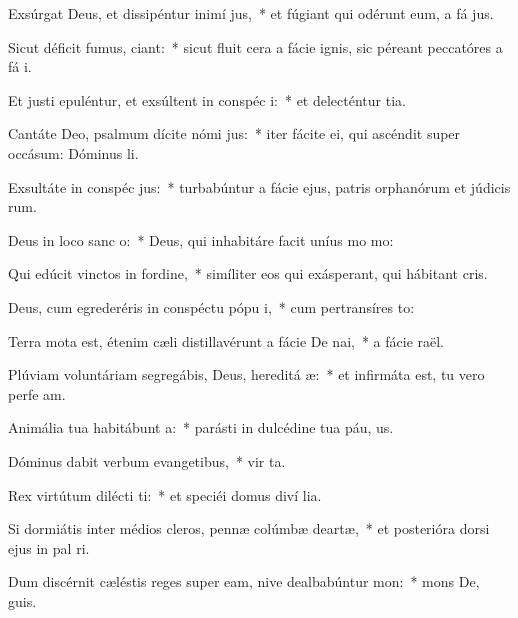 \item Exsúrgat Deus, et dissipéntur inimí jus,~* et fúgiant qui odérunt eum, a fá jus.
\item Sicut déficit fumus, ciant:~* sicut fluit cera a fácie ignis, sic péreant peccatóres a fá i.
\item Et justi epuléntur, et exsúltent in conspéc i:~* et delecténtur  tia.
\item Cantáte Deo, psalmum dícite nómi jus:~* iter fácite ei, qui ascéndit super occásum: Dóminus  li.
\item Exsultáte in conspéc jus:~* turbabúntur a fácie ejus, patris orphanórum et júdicis rum.
\item Deus in loco sanc o:~* Deus, qui inhabitáre facit uníus mo  mo:
\item Qui edúcit vinctos in fordine,~* simíliter eos qui exásperant, qui hábitant  cris.
\item Deus, cum egrederéris in conspéctu pópu i,~* cum pertransíres  to:
\item Terra mota est, étenim cæli distillavérunt a fácie De nai,~* a fácie  raël.
\item Plúviam voluntáriam segregábis, Deus, hereditá æ:~* et infirmáta est, tu vero perfe am.
\item Animália tua habitábunt  a:~* parásti in dulcédine tua páu, us.
\item Dóminus dabit verbum evangetibus,~* vir ta.
\item Rex virtútum dilécti ti:~* et speciéi domus diví lia.
\item Si dormiátis inter médios cleros, pennæ colúmbæ deartæ,~* et posterióra dorsi ejus in pal ri.
\item Dum discérnit cæléstis reges super eam, nive dealbabúntur  mon:~* mons De,  guis.

